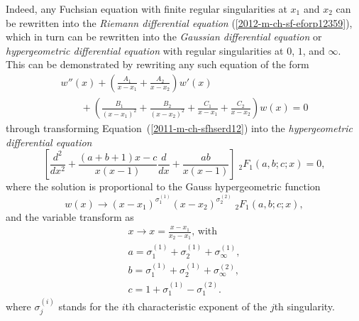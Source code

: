 Indeed, any Fuchsian  equation
with
finite  {regular singularities} at $x_1$ and $x_2$ can be rewritten into the
{\em Riemann differential equation}
(\ref{2012-m-ch-sf-eforp12359}),
which in turn can be rewritten into the
{\em Gaussian differential equation}
or
{\em hypergeometric differential equation}
with
regular singularities
at $0$, $1$, and $\infty$.\cite[-0mm]{hille-69,birkhoff-Rota-48,KristenssonC3}
This can be demonstrated by rewriting any such equation of the form
\begin{equation}
\begin{split}
 w''(x) + \left( \frac{A_1}{x-x_1}    + \frac{A_2}{x-x_2}
\right) w'(x)
\\ \qquad + \left(  \frac{B_1}{(x-x_1)^2}+\frac{B_2}{(x-x_2)^2} +\frac{C_1}{x-x_1} +\frac{C_2}{x-x_2}
\right)  w(x)  =0
\end{split}
\label{2011-m-ch-sfhserd12}
\end{equation}
through transforming Equation~(\ref{2011-m-ch-sfhserd12}) into the  {\em hypergeometric differential equation}
\begin{equation}
\left[{}\frac{d^2}{dx^2}+ \frac{(a+b+1)x-c}{x(x-1)}\frac{d}{dx}+\frac{ab}{x(x-1)} \right]
{\;}_2F_1(a,b;c;x)=0,
\label{2011-m-ch-sfhserd121eq}
\end{equation}
where the solution is proportional to the Gauss hypergeometric function
\begin{equation}
w(x) \longrightarrow (x-x_1)^{\sigma^{(1)}_1} (x-x_2)^{ \sigma^{(2)}_2} {\;}_2F_1(a,b;c;x),
\end{equation}
 and the variable transform as
\begin{equation}
\begin{split}
x \longrightarrow x = \frac{x-x_1}{x_2-x_1}  \textrm{, with}\\
a=  {\sigma^{(1)}_1}+{\sigma^{(1)}_2}   +{\sigma^{(1)}_\infty},  \\
b=  {\sigma^{(1)}_1}+{\sigma^{(1)}_2}   +{\sigma^{(2)}_\infty} ,\\
c= 1+ {\sigma^{(1)}_1}   -{\sigma^{(2)}_1} .
\end{split}
\label{2011-m-ch-sfhserd121}
\end{equation}
where $\sigma^{(i)}_j$ stands for the $i$th characteristic exponent of the $j$th singularity.



